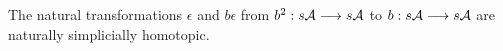 \documentclass[11pt]{amsart}
\theoremstyle{plain}
\begin{document}
\begin{prop}\label{IteratedBarConstructionHomotopy}
The natural transformations $\epsilon$ and $b\epsilon$ from $b^2:s\mathcal{A}\longrightarrow s\mathcal{A}$ to $b:s\mathcal{A}\longrightarrow s\mathcal{A}$ are naturally simplicially homotopic.
\end{prop}
\end{document}
